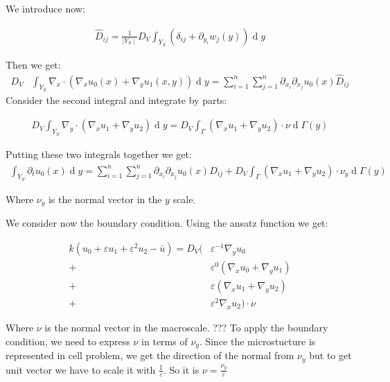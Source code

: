 \documentclass[10pt, a4paper]{article}
\begin{document}
 We introduce now:
 
\begin{align}
\hat D_{ij} = \frac{1}{\mid Y_S \mid} D_V \int_{Y_S}(\delta_{ij} + \partial_{y_i} w_j(y))\operatorname{d}y
\end{align}
 
 Then we get:
 \begin{align}
 D_V &\int_{Y_S} \nabla_x \cdot (\nabla_x u_0(x) + \nabla_yu_1(x,y)) \operatorname{d}y 
 = \sum_{i=1}^n\sum_{j=1}^n \partial_{x_i}\partial_{x_j}u_0(x) \hat D_{ij}
 \end{align}
 Consider the second integral and integrate by parts:
 
 \begin{align}
 \label{divergence theorem}
 D_V \int_{Y_S} \nabla_y \cdot (\nabla_x u_1 + \nabla_y u_2) \operatorname{d} y = D_V \int_\Gamma (\nabla_x u_1 + \nabla_y u_2) \cdot \nu \operatorname{d} \Gamma(y)
 \end{align}
 
 Putting these two integrals together we get:
 \begin{align}
 \label{integral}
 \int_{Y_S}\partial_t u_0(x)\operatorname{d}y = \sum_{i=1}^n\sum_{j=1}^n \partial_{x_i}\partial_{x_j}u_0(x) \hat D_{ij}+D_V \int_\Gamma (\nabla_x u_1 + \nabla_y u_2) \cdot \nu_y \operatorname{d} \Gamma(y)
 \end{align}
 
 Where $\nu_y$ is the normal vector in the $y$ scale.

 We consider now the boundary condition. Using the ansatz function we get:
 
 \begin{align}
 \label{boundary_cond_expansion_nu}
k(u_0 + \varepsilon u_1 + \varepsilon^2 u_2 - \bar{u}) = D_V(&\varepsilon^{-1} \nabla_y u_0 \\
+& \varepsilon^0(\nabla_x u_0 + \nabla_y u_1)\\
+& \varepsilon ( \nabla_x u_1 + \nabla_y u_2)\\
+& \varepsilon^2 \nabla_x u_2) \cdot \nu
\end{align}

Where $\nu$ is the normal vector in the macroscale. ??? To apply the boundary condition, we need to express $\nu$ in terms of $\nu_y$.
Since the microstucture is represented in cell problem, we get the direction of the normal from $\nu_y$ but to get unit vector we have to scale it with 
$\frac{1}{\varepsilon}$. So it is $\nu = \frac{\nu_y}{\varepsilon}$
\end{document}
